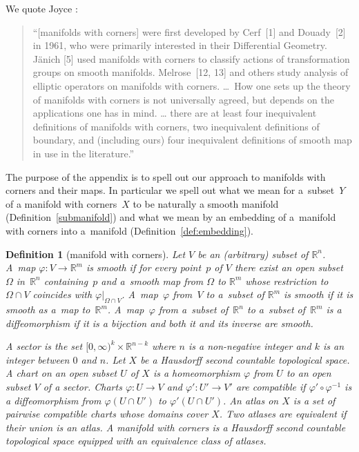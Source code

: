 \documentclass[10pt,a4paper]{amsart}
\numberwithin{equation}{section}
\newtheorem{Definition}[Lemma]{Definition}
\begin{document}
We quote Joyce \cite{Joyce}:
\begin{quote}
  ``[manifolds with corners] were f\/irst developed by Cerf~[1] and Douady~[2] in 1961, who were primarily interested in their
  Dif\/ferential Geometry. J\"anich [5] used manifolds with corners to
  classify actions of transformation groups on smooth manifolds.
  Melrose~[12, 13] and others study analysis of elliptic operators on
  manifolds with corners.
  \ldots\
  How one sets up
  the theory of manifolds with corners is not universally agreed, but
  depends on the applications one has in mind. \ldots
  there are at least four inequivalent def\/initions of manifolds with
  corners, two inequivalent def\/initions of boundary, and (including
  ours) four inequivalent def\/initions of smooth map in use in the
  literature.''
\end{quote}
The purpose of the appendix is to spell out our approach to manifolds
with corners and their maps.  In particular we spell out what we mean
for a~subset~$Y$ of a manifold with corners~$X$ to be naturally a
smooth manifold (Def\/inition~\ref{submanifold}) and what we mean by an
embedding of a~manifold with corners into a~manifold
(Def\/inition~\ref{def:embedding}).


\begin{Definition}[manifold with corners] \label{md w corners}\sloppy
Let $V$ be an (arbitrary) subset of ${\mathbb R}^n$.  A~map \mbox{$\varphi \colon V \to {\mathbb R}^m$}
is \emph{smooth} if for every point~$p$ of $V$ there exist
an open subset~$\Omega$ in~${\mathbb R}^n$ containing~$p$ and a~smooth map
from $\Omega$ to ${\mathbb R}^m$ whose restriction to~$\Omega \cap V$
coincides with $\varphi|_{\Omega \cap V}$.
A~map~$\varphi$ from~$V$ to a~subset of ${\mathbb R}^m$ is \emph{smooth}
if it is smooth as a~map to~${\mathbb R}^m$.  A~map~$\varphi$ from a~subset
of~${\mathbb R}^n$ to a~subset of~${\mathbb R}^m$ is a \emph{diffeomorphism}
if it is a bijection and both it and its inverse are smooth.

A \emph{sector} is the set $[0,\infty)^k \times {\mathbb R}^{n-k}$
where $n$ is a non-negative integer and $k$ is an integer between $0$ and $n$.
Let $X$ be a Hausdorf\/f second countable topological space.
A \emph{chart} on an open subset $U$ of $X$ is a homeomorphism $\varphi$
from $U$ to an open subset $V$ of a sector.
Charts $\varphi \colon U \to V$ and $\varphi' \colon U' \to V'$
are \emph{compatible} if $\varphi' \circ \varphi^{-1}$ is
a dif\/feomorphism from $\varphi(U \cap U')$ to $\varphi'(U \cap U')$.
An \emph{atlas} on $X$ is a set of pairwise compatible charts
whose domains cover $X$. Two atlases are \emph{equivalent}
if their union is an atlas.
A \emph{manifold with corners} is a Hausdorf\/f second countable
topological space equipped with an equivalence class of atlases.
\end{Definition}
\end{document}
